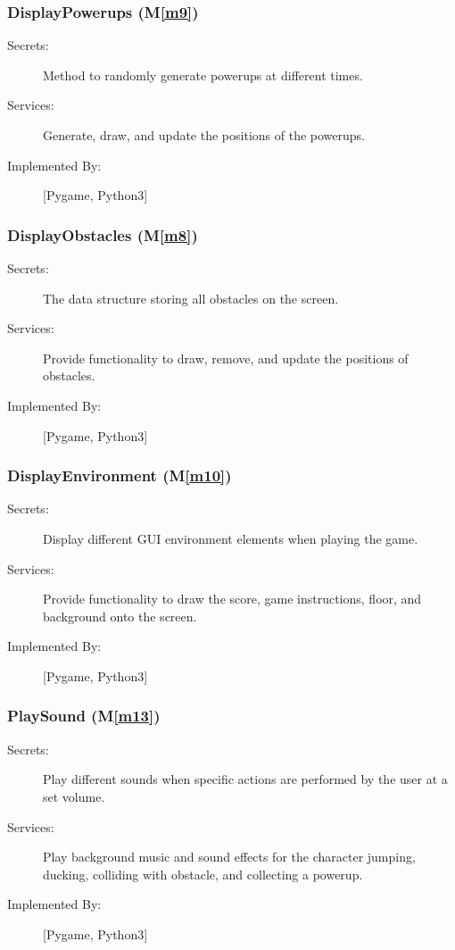 \documentclass[12pt, titlepage]{article}
\newcommand{\mref}[1]{M\ref{#1}}
\begin{document}
\subsubsection{DisplayPowerups (\mref{m9})}
\begin{description}
\item[Secrets:]  Method to randomly generate powerups at different times. 
\item[Services:] Generate, draw, and update the positions of the powerups.
\item[Implemented By:] [Pygame, Python3]
\end{description}

\subsubsection{DisplayObstacles (\mref{m8})}
\begin{description}
\item[Secrets:] The data structure storing all obstacles on the screen.
\item[Services:] Provide functionality to draw, remove, and update the positions of obstacles.
\item[Implemented By:] [Pygame, Python3]
\end{description}

\subsubsection{DisplayEnvironment (\mref{m10})}
\begin{description}
\item[Secrets:] Display different GUI environment elements when playing the game.
\item[Services:] Provide functionality to draw the score, game instructions, floor, and background onto the screen.
\item[Implemented By:] [Pygame, Python3]
\end{description}

\subsubsection{PlaySound (\mref{m13})}
\begin{description}
\item[Secrets:] Play different sounds when specific actions are performed by the user at a set volume.
\item[Services:] Play background music and sound effects for the character jumping, ducking, colliding with obstacle, and collecting a powerup.
\item[Implemented By:] [Pygame, Python3]
\end{description}
\end{document}
